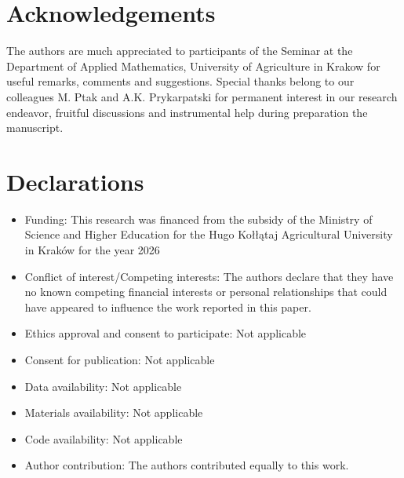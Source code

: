 \documentclass[pdflatex,sn-mathphys-num]{sn-jnl}%
\theoremstyle{thmstyleone}%
\theoremstyle{thmstyletwo}%
\theoremstyle{thmstylethree}%
\begin{document}
\section{Acknowledgements}

The authors are much appreciated to participants of the Seminar at the
Department of Applied Mathematics, University of Agriculture in Krakow for
useful remarks, comments and suggestions. Special thanks belong to our
colleagues M. Ptak and A.K. Prykarpatski for permanent interest in our
research endeavor, fruitful discussions and instrumental help during
preparation the manuscript.

\section*{Declarations}



\begin{itemize}
	\item Funding: This research was financed from the subsidy of the 
	Ministry of Science and Higher Education for the Hugo Kołłątaj 
	Agricultural University in Kraków for the year 2026
	\item Conflict of interest/Competing interests: The authors declare that they have no known competing financial interests or personal relationships that could have appeared to influence the work reported in this paper.
	\item Ethics approval and consent to participate: Not applicable
	\item Consent for publication: Not applicable
	\item Data availability: Not applicable
	\item Materials availability: Not applicable
	\item Code availability: Not applicable
	\item Author contribution: The authors contributed equally to this work.
\end{itemize}
\end{document}
